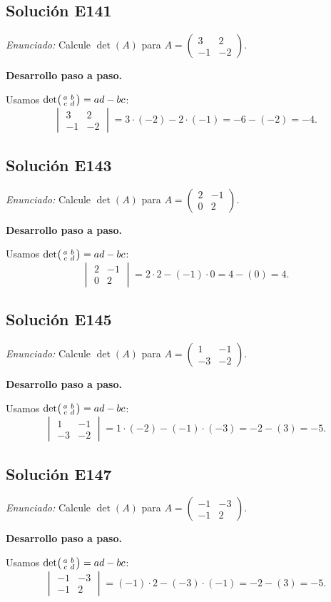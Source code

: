 \documentclass[12pt]{article}
\theoremstyle{remark}
\newcommand{\solucion}[2]{\Needspace{11\baselineskip}\subsection*{Solución E#1}\noindent\textit{Enunciado:} #2\par\medskip\noindent\textbf{Desarrollo paso a paso.}\par\medskip}
\begin{document}
\medskip

\solucion{141}{Calcule $\det(A)$ para $A=\begin{pmatrix}3&2\\-1&-2\end{pmatrix}$.}
Usamos $\det\begin{psmallmatrix}a&b\\c&d\end{psmallmatrix}=ad-bc$:
\[
\begin{vmatrix}3&2\\-1&-2\end{vmatrix}=3\cdot (-2)-2\cdot (-1)=-6-(-2)=-4.
\]

\medskip

\solucion{143}{Calcule $\det(A)$ para $A=\begin{pmatrix}2&-1\\0&2\end{pmatrix}$.}
Usamos $\det\begin{psmallmatrix}a&b\\c&d\end{psmallmatrix}=ad-bc$:
\[
\begin{vmatrix}2&-1\\0&2\end{vmatrix}=2\cdot 2-(-1)\cdot 0=4-(0)=4.
\]

\medskip

\solucion{145}{Calcule $\det(A)$ para $A=\begin{pmatrix}1&-1\\-3&-2\end{pmatrix}$.}
Usamos $\det\begin{psmallmatrix}a&b\\c&d\end{psmallmatrix}=ad-bc$:
\[
\begin{vmatrix}1&-1\\-3&-2\end{vmatrix}=1\cdot (-2)-(-1)\cdot (-3)=-2-(3)=-5.
\]

\medskip

\solucion{147}{Calcule $\det(A)$ para $A=\begin{pmatrix}-1&-3\\-1&2\end{pmatrix}$.}
Usamos $\det\begin{psmallmatrix}a&b\\c&d\end{psmallmatrix}=ad-bc$:
\[
\begin{vmatrix}-1&-3\\-1&2\end{vmatrix}=(-1)\cdot 2-(-3)\cdot (-1)=-2-(3)=-5.
\]
\end{document}
